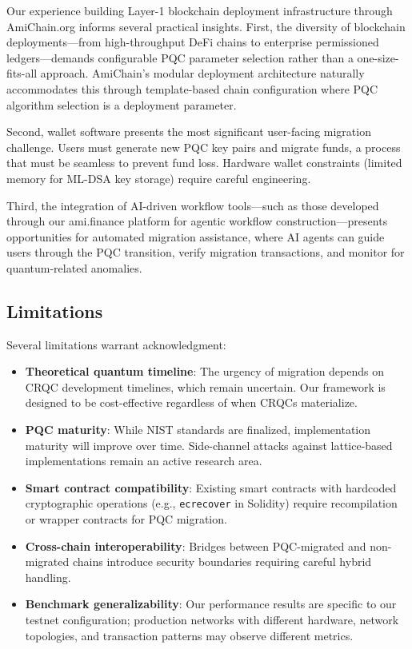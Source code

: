 \documentclass[12pt, a4paper, twocolumn]{article}
\begin{document}
Our experience building Layer-1 blockchain deployment infrastructure through AmiChain.org informs several practical insights. First, the diversity of blockchain deployments---from high-throughput DeFi chains to enterprise permissioned ledgers---demands configurable PQC parameter selection rather than a one-size-fits-all approach. AmiChain's modular deployment architecture naturally accommodates this through template-based chain configuration where PQC algorithm selection is a deployment parameter.

Second, wallet software presents the most significant user-facing migration challenge. Users must generate new PQC key pairs and migrate funds, a process that must be seamless to prevent fund loss. Hardware wallet constraints (limited memory for ML-DSA key storage) require careful engineering.

Third, the integration of AI-driven workflow tools---such as those developed through our ami.finance platform for agentic workflow construction---presents opportunities for automated migration assistance, where AI agents can guide users through the PQC transition, verify migration transactions, and monitor for quantum-related anomalies.

\subsection{Limitations}

Several limitations warrant acknowledgment:

\begin{itemize}[noitemsep]
  \item \textbf{Theoretical quantum timeline}: The urgency of migration depends on CRQC development timelines, which remain uncertain. Our framework is designed to be cost-effective regardless of when CRQCs materialize.
  \item \textbf{PQC maturity}: While NIST standards are finalized, implementation maturity will improve over time. Side-channel attacks against lattice-based implementations remain an active research area.
  \item \textbf{Smart contract compatibility}: Existing smart contracts with hardcoded cryptographic operations (e.g., \texttt{ecrecover} in Solidity) require recompilation or wrapper contracts for PQC migration.
  \item \textbf{Cross-chain interoperability}: Bridges between PQC-migrated and non-migrated chains introduce security boundaries requiring careful hybrid handling.
  \item \textbf{Benchmark generalizability}: Our performance results are specific to our testnet configuration; production networks with different hardware, network topologies, and transaction patterns may observe different metrics.
\end{itemize}
\end{document}

